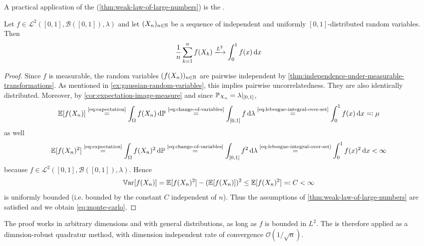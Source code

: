 A practical application of the  (\autoref{thm:weak-law-of-large-numbers}) is the .
\begin{theorem}\label{thm:monte-carlo}
Let $f \in \mathcal{L}^2([0,1],\mathcal{B}([0,1]),\lambda)$ and let $(X_n)_{n \in \mathbb{N}}$ be a sequence of independent and uniformly $[0,1]$-distributed random variables.
Then
\begin{equation}\label{eq:monte-carlo}
\frac{1}{n}\sum_{k=1}^n f(X_k)
\xlongrightarrow{L^2}
\int_0^1 f(x)\,\dif x
\qedhere
\end{equation}
\end{theorem}
\begin{proof}
Since 
\(f\) is measurable, the random variables
\((f(X_n))_{n\in\mathbb{N}}\) are pairwise independent by \autoref{thm:independence-under-measurable-transformations}.
As mentioned in \autoref{ex:gaussian-random-variables}, this implies pairwise uncorrelatedness.
They are also identically distributed.
Moreover, by \autoref{cor:expectation-image-measure} and since
\(
\mathbb{P}_{X_n} \allowbreak = \allowbreak \lambda|_{[0,1]}
\),
\[
\operatorname{\mathbb{E}}[f(X_n)]
\overset{\text{\eqref{eq:expectation}}}{=}
\int_\Omega f(X_n)\,\mathrm{d}\mathbb{P}
\overset{\text{\eqref{eq:change-of-variables}}}{=}
\int_{[0,1]} f\,\mathrm{d}\lambda
\overset{\text{\eqref{eq:lebesgue-integral-over-set}}}{=}
\int_0^1 f(x)\,\mathrm{d} x
\eqqcolon
\mu
\]
as well 
\[
\operatorname{\mathbb{E}}[f(X_n)^2]
\overset{\text{\eqref{eq:expectation}}}{=}
\int_\Omega f(X_n)^2\,\mathrm{d}\mathbb{P}
\overset{\text{\eqref{eq:change-of-variables}}}{=}
\int_{[0,1]} f^2\,\mathrm{d}\lambda
\overset{\text{\eqref{eq:lebesgue-integral-over-set}}}{=}
\int_0^1 f(x)^2\,\mathrm{d} x
<
\infty
\]
because \(f \in \mathcal{L}^2([0,1],\mathcal{B}([0,1]),\lambda)\).
Hence
\[
\operatorname{\mathbb{V}ar}[f(X_n)]
=
\operatorname{\mathbb{E}}[f(X_n)^2]-(\operatorname{\mathbb{E}}[f(X_n)])^2
\leq
\operatorname{\mathbb{E}}[f(X_n)^2]
\eqqcolon
C
<\infty
\]
is uniformly bounded (i.e. bounded by the constant $C$ independent of $n$).
Thus the assumptions of \autoref{thm:weak-law-of-large-numbers} are satisfied and we obtain \eqref{eq:monte-carlo}.
\end{proof}

\begin{remark}
The proof works in arbitrary dimensions and with general distributions, as long as $f$ is bounded in $L^2$.
The  is therefore applied as a dimnsion-robust quadratur method, with dimension independent rate of convergence $\mathcal{O}(1/\sqrt{n})$.
\end{remark}


